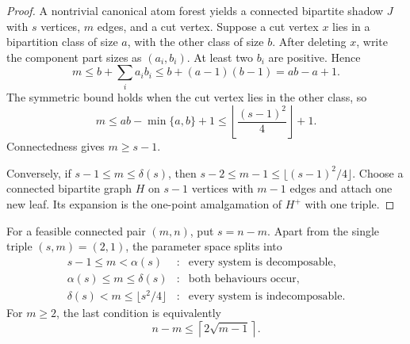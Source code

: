 \begin{proof}
A nontrivial canonical atom forest yields a connected bipartite shadow $J$
with $s$ vertices, $m$ edges, and a cut vertex.  Suppose a cut vertex $x$ lies
in a bipartition class of size $a$, with the other class of size $b$.  After
deleting $x$, write the component part sizes as $(a_i,b_i)$.  At least two
$b_i$ are positive.  Hence
\[
 m\le b+\sum_i a_i b_i
   \le b+(a-1)(b-1)=ab-a+1.
\]
The symmetric bound holds when the cut vertex lies in the other class, so
\[
 m\le ab-\min\{a,b\}+1
 \le \left\lfloor\frac{(s-1)^2}{4}\right\rfloor+1.
\]
Connectedness gives $m\ge s-1$.

Conversely, if $s-1\le m\le\delta(s)$, then
$s-2\le m-1\le\lfloor (s-1)^2/4\rfloor$.  Choose a connected bipartite graph
$H$ on $s-1$ vertices with $m-1$ edges and attach one new leaf.  Its expansion
is the one-point amalgamation of $H^+$ with one triple.
\end{proof}

\begin{corollary}\label{cor:indecomposable-phase}
For a feasible connected pair $(m,n)$, put $s=n-m$.  Apart from the single
triple $(s,m)=(2,1)$, the parameter space splits into
\[
\begin{array}{rcll}
 s-1\le m<\alpha(s)
   &:& \text{every system is decomposable},\\[2mm]
 \alpha(s)\le m\le\delta(s)
   &:& \text{both behaviours occur},\\[2mm]
 \delta(s)<m\le\lfloor s^2/4\rfloor
   &:& \text{every system is indecomposable}.
\end{array}
\]
For $m\ge2$, the last condition is equivalently
\[
 n-m\le\left\lceil2\sqrt{m-1}\right\rceil.
\]
\end{corollary}
